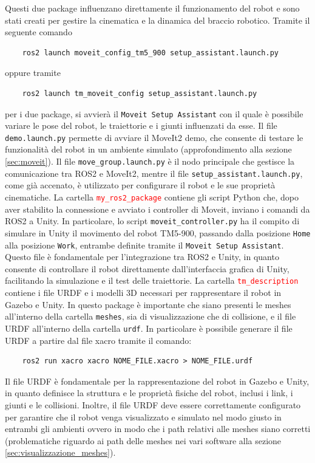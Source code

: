\documentclass[11pt]{report}
\begin{document}
Questi due package influenzano direttamente il funzionamento del robot e sono stati creati per gestire la cinematica e la dinamica del braccio robotico. Tramite il seguente comando 
\begin{verbatim}
    ros2 launch moveit_config_tm5_900 setup_assistant.launch.py
\end{verbatim}
oppure tramite 
\begin{verbatim}
    ros2 launch tm_moveit_config setup_assistant.launch.py
\end{verbatim} 
per i due package, si avvierà il \texttt{Moveit Setup Assistant} con il quale è possibile variare le pose del robot, le traiettorie e i giunti influenzati da esse. Il file {\texttt{demo.launch.py}} permette di avviare il MoveIt2 demo, che consente di testare le funzionalità del robot in un ambiente simulato (approfondimento alla sezione \ref{sec:moveit}). Il file {\texttt{move\_group.launch.py}} è il nodo principale che gestisce la comunicazione tra ROS2 e MoveIt2, mentre il file {\texttt{setup\_assistant.launch.py}}, come già accenato, è utilizzato per configurare il robot e le sue proprietà cinematiche.
\newline
La cartella \textcolor{red}{\texttt{my\_ros2\_package}} contiene gli script Python che, dopo aver stabilito la connessione e avviato i controller di Moveit, inviano i comandi da ROS2 a Unity. In particolare, lo script {\texttt{moveit\_controller.py}} ha il compito di simulare in Unity il movimento del robot TM5-900, passando dalla posizione \texttt{Home} alla posizione \texttt{Work}, entrambe definite tramite il \texttt{Moveit Setup Assistant}. Questo file è fondamentale per l'integrazione tra ROS2 e Unity, in quanto consente di controllare il robot direttamente dall'interfaccia grafica di Unity, facilitando la simulazione e il test delle traiettorie.
\newline
La cartella \textcolor{red}{\texttt{tm\_description}} contiene i file URDF e i modelli 3D necessari per rappresentare il robot in Gazebo e Unity. In questo package è importante che siano presenti le meshes all'interno della cartella \texttt{meshes}, sia di visualizzazione che di collisione, e il file URDF all'interno della cartella \texttt{urdf}.
In particolare è possibile generare il file URDF a partire dal file xacro tramite il comando:
\begin{verbatim}
    ros2 run xacro xacro NOME_FILE.xacro > NOME_FILE.urdf
\end{verbatim}
Il file URDF è fondamentale per la rappresentazione del robot in Gazebo e Unity, in quanto definisce la struttura e le proprietà fisiche del robot, inclusi i link, i giunti e le collisioni. Inoltre, il file URDF deve essere correttamente configurato per garantire che il robot venga visualizzato e simulato nel modo giusto in entrambi gli ambienti ovvero in modo che i path relativi alle meshes siano corretti (problematiche riguardo ai path delle meshes nei vari software alla sezione \ref{sec:visualizzazione_meshes}).
\end{document}
